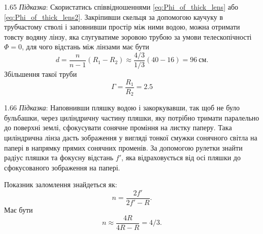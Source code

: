 \begin{Solution}{1.{65}}
	\emph{Підказка}: Скористатись співвідношеннями \eqref{eq:Phi_of_thick_lens} або \eqref{eq:Phi_of_thick_lens2}.
	Закріпивши скельця за допомогою каучуку в трубчастому стволі і
	заповнивши простір між ними водою, можна отримати товсту водяну
	лінзу, яка слугуватиме зоровою трубою за умови телескопічності $\Phi = 0$,
	для чого відстань між лінзами має бути
	\begin{equation*}
		d = \frac{n}{n - 1}(R_1 - R_2) \approx \frac{4/3}{1/3}(40-16) = 96\ \text{см}.
	\end{equation*}
	Збільшення такої труби
	\begin{equation*}
		\Gamma = \frac{R_1}{R_2} = 2.5
	\end{equation*}
\end{Solution}
\begin{Solution}{1.{66}}
	\emph{Підказка}: Наповнивши пляшку водою і закоркувавши, так щоб не
	було бульбашки, через циліндричну частину пляшки, яку потрібно
	тримати паралельно до поверхні землі, сфокусувати сонячне проміння
	на листку паперу. Така циліндрична лінза дасть зображення у вигляді
	тонкої смужки сонячного світла на папері в напрямку прямих сонячних
	променів. За допомогою рулетки знайти радіус пляшки та фокусну
	відстань $f'$, яка відраховується від осі пляшки до сфокусованого
	зображення на папері.

	Показник заломлення знайдеться як:
	\begin{equation*}
		n = \frac{2f'}{2f' - R}.
	\end{equation*}
	Має бути
	\begin{equation*}
		n \approx \frac{4R}{4R - R} = 4/3.
	\end{equation*}
\end{Solution}
